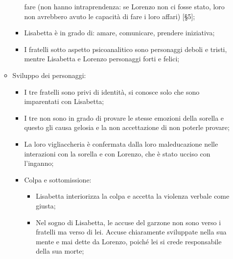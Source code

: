 \documentclass{article}
\begin{document}
\begin{enumerate}
\begin{subenumerate}
\begin{itemize}
\begin{itemize}
                            fare (non hanno intraprendenza: se Lorenzo non ci fosse stato,
                            loro non avrebbero avuto le capacità di fare i loro affari) [§5];
                            \item Lisabetta è in grado di: amare, comunicare, prendere
                                iniziativa;
                            \item I fratelli sotto aspetto psicoanalitico sono personaggi
                                deboli e tristi, mentre Lisabetta e Lorenzo personaggi forti
                                e felici;
                        \end{itemize}
                    \item Sviluppo dei personaggi:
                        \begin{itemize}
                            \item I tre fratelli sono privi di identità, si conosce solo che
                                sono imparentati con Lisabetta;
                            \item I tre non sono in grado di provare le stesse emozioni della
                                sorella e questo gli causa gelosia e la non accettazione di
                                non poterle provare;
                            \item La loro vigliaccheria è confermata dalla loro maleducazione
                                nelle interazioni con la sorella e con Lorenzo, che è stato
                                ucciso con l'inganno;
                            \item Colpa e sottomissione:
                                \begin{itemize}
                                    \item Lisabetta interiorizza la colpa e accetta la
                                        violenza verbale come giusta;
                                    \item Nel sogno di Lisabetta, le accuse del garzone non
                                        sono verso i fratelli ma verso di lei. Accuse
                                        chiaramente sviluppate nella sua mente e mai dette
                                        da Lorenzo, poiché lei si crede responsabile della
                                        sua morte;
                                \end{itemize}
                        \end{itemize}

\end{itemize}
\end{subenumerate}
\end{enumerate}
\end{document}
